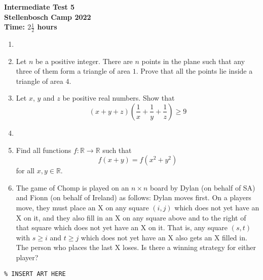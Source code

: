 \documentclass{article}
\begin{document}
\thispagestyle{empty}

\begin{center}
  \textbf{\Large Intermediate Test 5}
  \\ \vspace{1em}
  \textbf{\large Stellenbosch Camp 2022}
  \\ \vspace{1em}
  \textbf{\large Time: $2\frac{1}{2}$ hours}
\end{center}

\bigskip \bigskip

\begin{enumerate}[itemsep=\fill]

\item %

 
\item %

Let $n$ be a positive integer. There are $n$ points in the plane such that any three of them form a triangle of area $1$. Prove that all the points lie inside a triangle of area $4$. 

\item %

Let $x$, $y$ and $z$ be positive real numbers. Show that 
$$(x+y+z)\left(\frac{1}{x}+\frac{1}{y}+\frac{1}{z}\right) \geq 9$$


\item %


\item %
Find all functions $f : \mathbb{R} \to \mathbb{R}$ such that \[ f(x+y) = f(x^2+y^2) \] for all $x,y \in \mathbb{R}$.


\item %
The game of Chomp is played on an $n \times n$ board by Dylan (on behalf of SA) and Fionn (on behalf of Ireland) as follows: Dylan moves first. On a players move, they must place an X on any square $(i, j)$ which does not yet have an X on it, and they also fill in an X on any square above and to the right of that square which does not yet have an X on it. That is, any square $(s, t)$ with $s \geq i$ and $t \geq j$ which does not yet have an X also gets an X filled in. The person who places the last X loses. Is there a winning strategy for either player?

\end{enumerate}


\vfill
\centering
\small
\begin{BVerbatim}
\end{BVerbatim}
\end{document}
